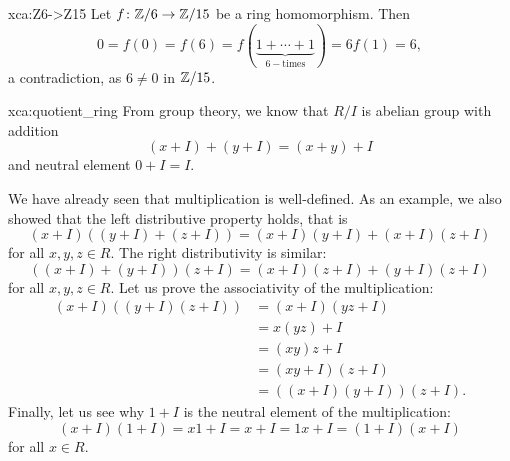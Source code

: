 \begin{sol}{xca:Z6->Z15}
    Let $f\colon\mathbb{Z}/6\to\mathbb{Z}/15$ be a ring homomorphism. Then 
    \[
    0=f(0)=f(6)=f(\underbrace{1+\cdots+1}_{6-\text{times}})=6f(1)=6,
    \]
    a contradiction, as $6\ne 0$ in $\mathbb{Z}/15$. 
\end{sol}

\begin{sol}{xca:quotient_ring}
From group theory, we know that $R/I$ is abelian group with addition 
\[
    (x+I)+(y+I)=(x+y)+I
\]
and neutral element $0+I=I$. 

We have already seen that multiplication is well-defined. 
As an example, we also showed that 
the left distributive property holds, that is 
\[
 (x+I)\left((y+I)+(z+I)\right)=(x+I)(y+I)+(x+I)(z+I)
\]
for all $x,y,z\in R$. The right distributivity is similar: 
\[
 \left((x+I)+(y+I)\right)(z+I)=(x+I)(z+I)+(y+I)(z+I)
\]
for all $x,y,z\in R$. 
Let us prove the associativity of the
multiplication: 
\begin{align*}
    (x+I)\left((y+I)(z+I)\right) &= (x+I)(yz+I)\\
    &=x(yz)+I\\
    &=(xy)z+I\\
    &=(xy+I)(z+I)\\
    &=\left((x+I)(y+I)\right)(z+I).
\end{align*}
Finally, let us see why $1+I$ is the neutral element of the multiplication:
\[
(x+I)(1+I)=x1+I=x+I=1x+I=(1+I)(x+I)
\]
for all $x\in R$. 
\end{sol}

